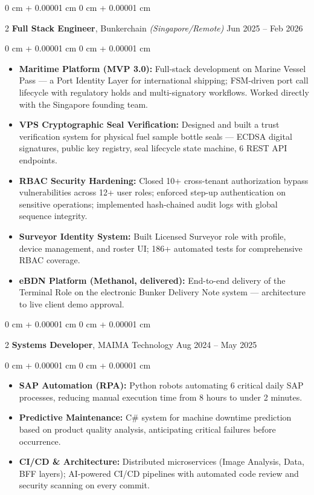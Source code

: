 \documentclass[10pt, letterpaper]{article}
\newenvironment{highlights}{ \begin{itemize}[ topsep=0.10 cm, parsep=0.10 cm, partopsep=0pt,
itemsep=0pt, leftmargin=0 cm + 10pt ] }{ \end{itemize} }
\newenvironment{onecolentry}{ \begin{adjustwidth}{ 0 cm + 0.00001 cm }{ 0 cm + 0.00001 cm }
}{ \end{adjustwidth} }
\newenvironment{twocolentry}[2][]{ \onecolentry \def\secondColumn{#2} \setcolumnwidth{\fill, 4.5 cm}
\begin{paracol}{2} }{ \switchcolumn \raggedleft \secondColumn \end{paracol}
\endonecolentry }
\begin{document}
    \vspace{0.2 cm}

    \begin{twocolentry}
		{ Jun 2025 -- Feb 2026 } \textbf{Full Stack Engineer}, Bunkerchain \textit{(Singapore/Remote)}
	\end{twocolentry}

	\vspace{0.10 cm}
	\begin{onecolentry}
		\begin{highlights}
			\item \textbf{Maritime Platform (MVP 3.0):} Full-stack development on Marine Vessel Pass --- a Port Identity Layer for international shipping; FSM-driven port call lifecycle with regulatory holds and multi-signatory workflows. Worked directly with the Singapore founding team.
            \item \textbf{VPS Cryptographic Seal Verification:} Designed and built a trust verification system for physical fuel sample bottle seals --- ECDSA digital signatures, public key registry, seal lifecycle state machine, 6 REST API endpoints.
            \item \textbf{RBAC Security Hardening:} Closed 10+ cross-tenant authorization bypass vulnerabilities across 12+ user roles; enforced step-up authentication on sensitive operations; implemented hash-chained audit logs with global sequence integrity.
            \item \textbf{Surveyor Identity System:} Built Licensed Surveyor role with profile, device management, and roster UI; 186+ automated tests for comprehensive RBAC coverage.
			\item \textbf{eBDN Platform (Methanol, delivered):} End-to-end delivery of the Terminal Role on the electronic Bunker Delivery Note system --- architecture to live client demo approval.
		\end{highlights}
	\end{onecolentry}

	\vspace{0.2 cm}

	\begin{twocolentry}
		{ Aug 2024 -- May 2025 } \textbf{Systems Developer}, MAIMA Technology
	\end{twocolentry}

	\vspace{0.10 cm}
	\begin{onecolentry}
		\begin{highlights}
			\item \textbf{SAP Automation (RPA):} Python robots automating 6 critical daily SAP processes, reducing manual execution time from 8 hours to under 2 minutes.
			\item \textbf{Predictive Maintenance:} C\# system for machine downtime prediction based on product quality analysis, anticipating critical failures before occurrence.
            \item \textbf{CI/CD \& Architecture:} Distributed microservices (Image Analysis, Data, BFF layers); AI-powered CI/CD pipelines with automated code review and security scanning on every commit.
		\end{highlights}
	\end{onecolentry}
\end{document}
